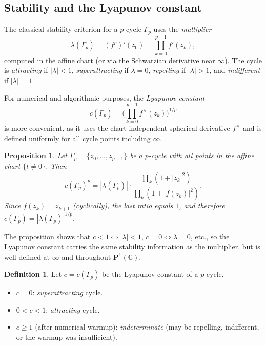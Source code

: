 \documentclass[12pt]{article}
\newtheorem{proposition}[theorem]{Proposition}
\theoremstyle{definition}
\newtheorem{definition}[theorem]{Definition}
\newcommand{\C}{\mathbb{C}}
\newcommand{\Pone}{\mathbf{P}^1(\C)}
\newcommand{\fsh}{f^{\#}}
\begin{document}
\subsection{Stability and the Lyapunov constant}

The classical stability criterion for a $p$-cycle $\Gamma_p$ uses the
\emph{multiplier}
\begin{equation}\label{eq:multiplier}
  \lambda(\Gamma_p) = (f^p)'(z_0) = \prod_{k=0}^{p-1} f'(z_k),
\end{equation}
computed in the affine chart (or via the Schwarzian derivative near $\infty$).
The cycle is \emph{attracting} if $|\lambda|<1$,
\emph{superattracting} if $\lambda=0$,
\emph{repelling} if $|\lambda|>1$, and
\emph{indifferent} if $|\lambda|=1$.

For numerical and algorithmic purposes, the \emph{Lyapunov constant}
\cite{AlvarezAparicio2023}
\begin{equation}\label{eq:lyapunov}
  c(\Gamma_p) = \biggl(\prod_{k=0}^{p-1}\fsh(z_k)\biggr)^{1/p}
\end{equation}
is more convenient, as it uses the chart-independent spherical derivative
$\fsh$ and is defined uniformly for all cycle points including $\infty$.

\begin{proposition}\label{prop:lyapunov_vs_multiplier}
Let $\Gamma_p=\{z_0,\ldots,z_{p-1}\}$ be a $p$-cycle with all points in
the affine chart $\{t\neq 0\}$.  Then
\[
  c(\Gamma_p)^p = |\lambda(\Gamma_p)|\cdot
                   \frac{\prod_k (1+|z_k|^2)}%
                        {\prod_k (1+|f(z_k)|^2)}.
\]
Since $f(z_{k})=z_{k+1}$ (cyclically), the last ratio equals $1$, and
therefore $c(\Gamma_p) = |\lambda(\Gamma_p)|^{1/p}$.
\end{proposition}

The proposition shows that $c<1\Leftrightarrow|\lambda|<1$,
$c=0\Leftrightarrow\lambda=0$, etc., so the Lyapunov constant carries
the same stability information as the multiplier, but is well-defined
at $\infty$ and throughout $\Pone$.

\begin{definition}\label{def:classification}
Let $c=c(\Gamma_p)$ be the Lyapunov constant of a $p$-cycle.
\begin{itemize}[noitemsep]
  \item $c=0$: \emph{superattracting} cycle.
  \item $0<c<1$: \emph{attracting} cycle.
  \item $c\geq 1$ (after numerical warmup): \emph{indeterminate}
        (may be repelling, indifferent, or the warmup was insufficient).
\end{itemize}
\end{definition}
\end{document}
